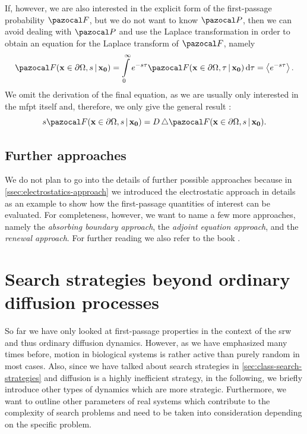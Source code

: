 \noindent If, however, we are also interested in the explicit form of the first-passage probability $\F$, but we do not want to know $\P$, then we can avoid dealing with $\P$ and use the Laplace transformation in order to obtain an equation for the Laplace transform of $\F$, namely
\begin{equation*}
 \F(\bv{x} \in \partial \Omega, s \,|\, \bv{x_0}) = \int\limits_0^\infty e^{-s\tau} \F(\bv{x} \in \partial \Omega, \tau \,|\, \bv{x_0}) \diff \tau = \avg{e^{-s\tau}}.
\end{equation*}
We omit the derivation of the final equation, as we are usually only interested in the \ac{mfpt} itself and, therefore, we only give the general result \cite{krapivsky:2010}:
\begin{equation}
 s \F(\bv{x} \in \partial \Omega, s \,|\, \bv{x_0}) = D \Laplace \F(\bv{x} \in \partial \Omega, s \,|\, \bv{x_0}).
\end{equation}

\subsection{Further approaches}
We do not plan to go into the details of further possible approaches because in \autoref{ssec:electrostatics-approach} we introduced the electrostatic approach in details as an example to show how the first-passage quantities of interest can be evaluated. For completeness, however, we want to name a few more approaches, namely the \textit{absorbing boundary approach}, the \textit{adjoint equation approach}, and the \textit{renewal approach}. For further reading we also refer to the book .

\section{Search strategies beyond ordinary diffusion processes}
So far we have only looked at first-passage properties in the context of the \ac{srw} and thus ordinary diffusion dynamics. However, as we have emphasized many times before, motion in biological systems is rather active than purely random in most cases. Also, since we have talked about search strategies in \autoref{sec:class-search-strategies} and diffusion is a highly inefficient strategy, in the following, we briefly introduce other types of dynamics which are more strategic. Furthermore, we want to outline other parameters of real systems which contribute to the complexity of search problems and need to be taken into consideration depending on the specific problem.

